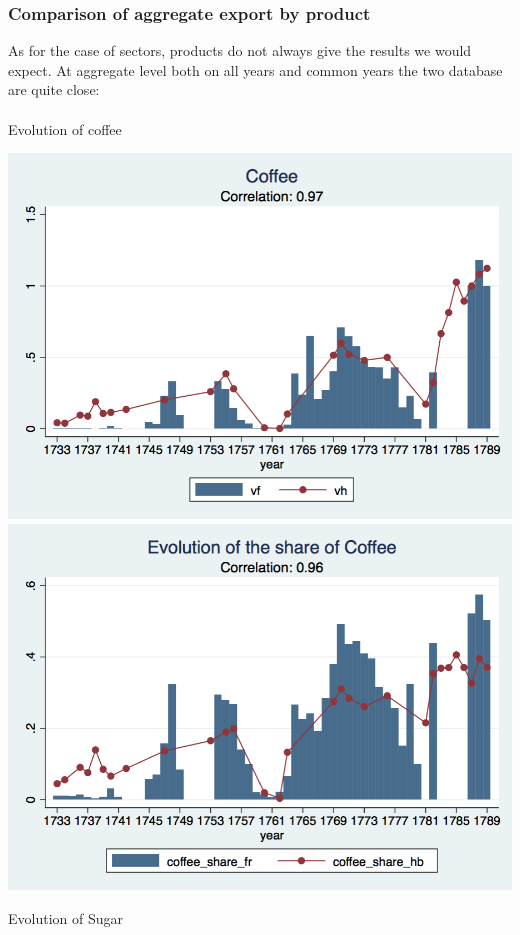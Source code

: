\documentclass[12pt,a4paper,titlepage]{article}
\begin{document}
\subsubsection{Comparison of aggregate export by product}
As for the case of sectors, products do not always give the results we would expect. At aggregate level both on all years and common years the two database are quite close:\\~\\
\caption{Evolution of coffee}
\includegraphics[scale=.28]{coffee_long.png}
\includegraphics[scale=.28]{coffee_share_long.png}\\
\newpage
\caption{Evolution of Sugar}
\end{document}
